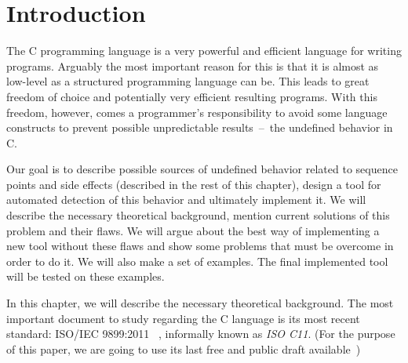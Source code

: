 
\chapter{Introduction}
The C programming language is a very powerful and efficient language for writing programs. Arguably the most important reason for this is that it is almost as low-level as a structured programming language can be. This leads to great freedom of choice and potentially very efficient resulting programs. With this freedom, however, comes a programmer's responsibility to avoid some language constructs to prevent possible unpredictable results~--~the undefined behavior in C.

Our goal is to describe possible sources of undefined behavior related to sequence points and side effects (described in the rest of this chapter), design a tool for automated detection of this behavior and ultimately implement it. We will describe the necessary theoretical background, mention current solutions of this problem and their flaws. We will argue about the best way of implementing a new tool without these flaws and show some problems that must be overcome in order to do it. We will also make a set of examples. The final implemented tool will be tested on these examples.

In this chapter, we will describe the necessary theoretical background. The most important document to study regarding the C language is its most recent standard: ISO/IEC 9899:2011~\cite{C11} , informally known as \emph{ISO C11}. (For the purpose of this paper, we are going to use its last free and public draft available~\cite{WG14N1570})

